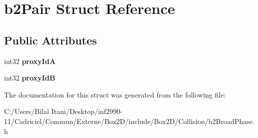 \hypertarget{structb2_pair}{}\section{b2\+Pair Struct Reference}
\label{structb2_pair}
\subsection*{Public Attributes}
\begin{DoxyCompactItemize}
\item 
int32 {\bfseries proxy\+IdA}\hypertarget{structb2_pair_abae3df5e877cf0c4611334e3eec4b84c}{}\label{structb2_pair_abae3df5e877cf0c4611334e3eec4b84c}

\item 
int32 {\bfseries proxy\+IdB}\hypertarget{structb2_pair_af2bd888ccb34535ab9126497349da749}{}\label{structb2_pair_af2bd888ccb34535ab9126497349da749}

\end{DoxyCompactItemize}


The documentation for this struct was generated from the following file\+:\begin{DoxyCompactItemize}
\item 
C\+:/\+Users/\+Bilal Itani/\+Desktop/inf2990-\/11/\+Cadriciel/\+Commun/\+Externe/\+Box2\+D/include/\+Box2\+D/\+Collision/b2\+Broad\+Phase.\+h\end{DoxyCompactItemize}

